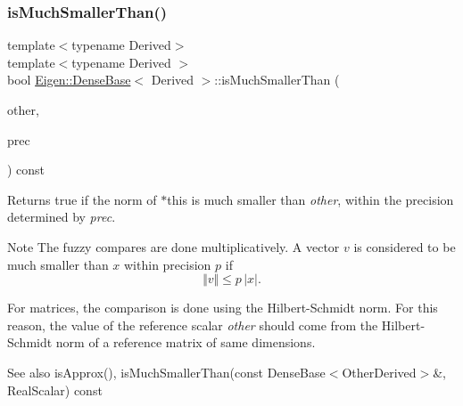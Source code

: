 \subsubsection{\texorpdfstring{isMuchSmallerThan()}{isMuchSmallerThan()}\hspace{0.1cm}{\footnotesize\ttfamily [1/2]}}
{\footnotesize\ttfamily template$<$typename Derived$>$ \\
template$<$typename Derived $>$ \\
bool \mbox{\hyperlink{class_eigen_1_1_dense_base}{Eigen\+::\+Dense\+Base}}$<$ Derived $>$\+::is\+Much\+Smaller\+Than (\begin{DoxyParamCaption}\item[{const typename \mbox{\hyperlink{struct_eigen_1_1_num_traits}{Num\+Traits}}$<$ \mbox{\hyperlink{class_eigen_1_1_dense_base_a5feed465b3a8e60c47e73ecce83e39a2}{Scalar}} $>$\+::Real \&}]{other,  }\item[{const Real\+Scalar \&}]{prec }\end{DoxyParamCaption}) const}

\begin{DoxyReturn}{Returns}
{\ttfamily true} if the norm of {\ttfamily $\ast$this} is much smaller than {\itshape other}, within the precision determined by {\itshape prec}.
\end{DoxyReturn}
\begin{DoxyNote}{Note}
The fuzzy compares are done multiplicatively. A vector $ v $ is considered to be much smaller than $ x $ within precision $ p $ if \[ \Vert v \Vert \leqslant p\,\vert x\vert. \]
\end{DoxyNote}
For matrices, the comparison is done using the Hilbert-\/\+Schmidt norm. For this reason, the value of the reference scalar {\itshape other} should come from the Hilbert-\/\+Schmidt norm of a reference matrix of same dimensions.

\begin{DoxySeeAlso}{See also}
is\+Approx(), is\+Much\+Smaller\+Than(const Dense\+Base$<$\+Other\+Derived$>$\&, Real\+Scalar) const 
\end{DoxySeeAlso}
\mbox{\label{class_eigen_1_1_dense_base_a7d61b8814a7547e88b25cba68b159f05}} 
